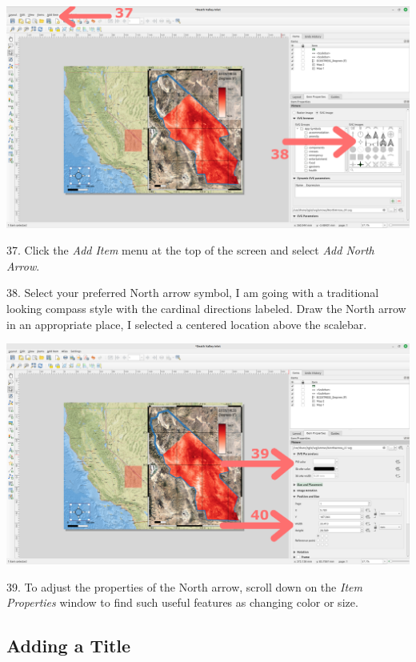 \documentclass[oneside,a4paper,11pt,explicit]{book}
\begin{document}
\vspace{.25em}

\centerline{\includegraphics[width=\textwidth]{NorthArrow1.png}}

37. Click the \textit{Add Item} menu at the top of the screen and select \textit{Add North Arrow}.

38. Select your preferred North arrow symbol, I am going with a traditional looking compass style with the cardinal directions labeled. Draw the North arrow in an appropriate place, I selected a centered location above the scalebar. 


\centerline{\includegraphics[width=\textwidth]{NorthArrow2.png}}

39.  To adjust the properties of the North arrow, scroll down on the \textit{Item Properties} window to find such useful features as changing color or size.

\subsection{Adding a Title}
\end{document}
